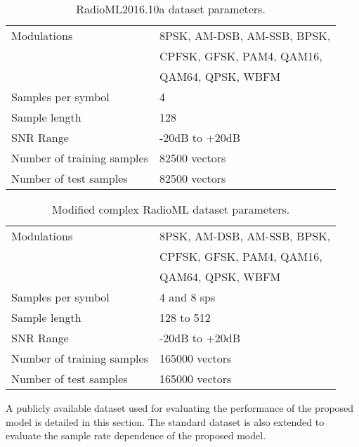 \begin{table}[!t]
\begin{center}
\begin{tabular}{|l|l|}
	\hline
    Modulations     & 8PSK, AM-DSB, AM-SSB, BPSK,\\
    								  & CPFSK, GFSK, PAM4, QAM16,\\
    								  & QAM64, QPSK, WBFM\\
    \hline
  	Samples per symbol &   4 \\
  	\hline	
    Sample length &   128 \\
  	\hline
    SNR Range &  -20dB to +20dB \\
  	\hline
   	Number of training samples &   82500 vectors\\
  	\hline
  	Number of test samples &  82500 vectors\\
    \hline
\end{tabular}
\end{center}
\caption{RadioML2016.10a dataset parameters.}
\label{table_rml_dataset}
\end{table}

\begin{table}[!t]
\begin{center}
\begin{tabular}{|l|l|}
	\hline
    Modulations     & 8PSK, AM-DSB, AM-SSB, BPSK,\\
    								  & CPFSK, GFSK, PAM4, QAM16,\\
    								  & QAM64, QPSK, WBFM\\
    \hline
  	Samples per symbol &   4 and 8 sps\\
  	\hline	
    Sample length &   128 to 512\\
  	\hline
    SNR Range &  -20dB to +20dB \\
  	\hline
  	Number of training samples &   165000 vectors\\
  	\hline
  	Number of test samples &  165000 vectors\\
    \hline
\end{tabular}
\end{center}
\caption{Modified complex RadioML dataset parameters.}
\label{table_modrml_dataset}
\end{table}

A publicly available dataset used for evaluating the performance of the proposed model is detailed in this section. The standard dataset is also extended to evaluate the sample rate dependence of the proposed model.


